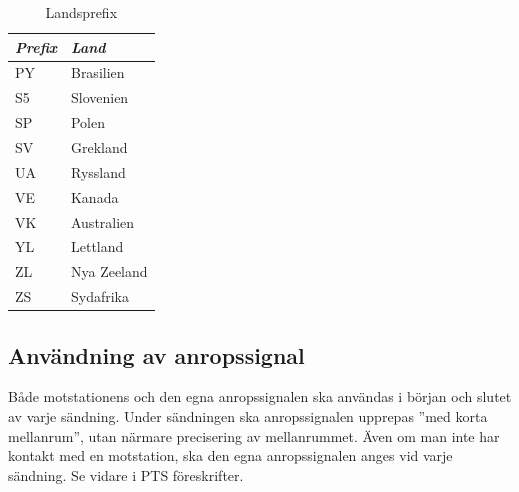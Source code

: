 \begin{table}[ht]
\begin{center}
\begin{minipage}{.3\linewidth}
      \begin{tabular}{ll}
        \emph{Prefix} & \emph{Land} \\
        \hline
        PY            & Brasilien   \\
        S5            & Slovenien   \\
        SP            & Polen       \\
        SV            & Grekland       \\
        UA            & Ryssland    \\
        VE            & Kanada      \\
        VK            & Australien  \\
        YL            & Lettland    \\
        ZL            & Nya Zeeland    \\
        ZS            & Sydafrika   \\
      \end{tabular}
    \end{minipage}
    \caption{Landsprefix}
    \label{tab:landsprefix}
  \end{center}
\end{table}

\subsection{Användning av anropssignal}

Både motstationens och den egna anropssignalen ska användas i början
och slutet av varje sändning.
Under sändningen ska anropssignalen upprepas ''med korta mellanrum'', utan
närmare precisering av mellanrummet.
Även om man inte har kontakt med en motstation, ska den egna anropssignalen
anges vid varje sändning.
Se vidare i PTS föreskrifter.
